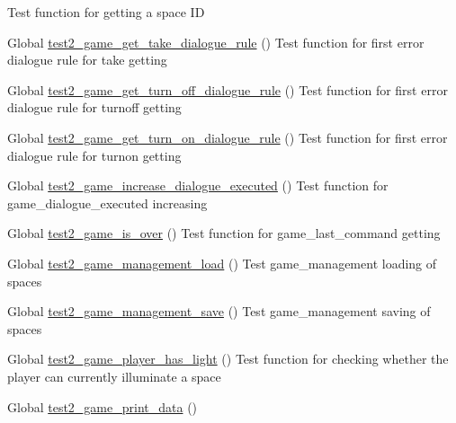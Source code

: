\begin{DoxyRefList}
%
Test function for getting a space ID  
\item[Global \mbox{\hyperlink{game__test_8c_a8b15ec8c8df88fdabcf8193fd6e143d4}{test2\+\_\+game\+\_\+get\+\_\+take\+\_\+dialogue\+\_\+rule}} ()]\label{test__test000336}%
%
Test function for first error dialogue rule for take getting  
\item[Global \mbox{\hyperlink{game__test_8c_af221f7b830274f0908050c98f1091024}{test2\+\_\+game\+\_\+get\+\_\+turn\+\_\+off\+\_\+dialogue\+\_\+rule}} ()]\label{test__test000362}%
%
Test function for first error dialogue rule for turnoff getting  
\item[Global \mbox{\hyperlink{game__test_8c_a6841a7c6d681976c7ecb6490cfedae02}{test2\+\_\+game\+\_\+get\+\_\+turn\+\_\+on\+\_\+dialogue\+\_\+rule}} ()]\label{test__test000356}%
%
Test function for first error dialogue rule for turnon getting  
\item[Global \mbox{\hyperlink{game__test_8c_a98e036c218642ab5490d742365a865f6}{test2\+\_\+game\+\_\+increase\+\_\+dialogue\+\_\+executed}} ()]\label{test__test000304}%
%
Test function for game\+\_\+dialogue\+\_\+executed increasing  
\item[Global \mbox{\hyperlink{game__test_8c_aad6c50be5f1d541ca5414b86558ef422}{test2\+\_\+game\+\_\+is\+\_\+over}} ()]\label{test__test000147}%
%
Test function for game\+\_\+last\+\_\+command getting  
\item[Global \mbox{\hyperlink{game__management__test_8c_a507fc7bcd3073298c0e78ff651b864f3}{test2\+\_\+game\+\_\+management\+\_\+load}} ()]\label{test__test000110}%
%
Test game\+\_\+management loading of spaces  
\item[Global \mbox{\hyperlink{game__management__test_8c_a29bd8e54b3cff03a5130d6c81901573e}{test2\+\_\+game\+\_\+management\+\_\+save}} ()]\label{test__test000124}%
%
Test game\+\_\+management saving of spaces  
\item[Global \mbox{\hyperlink{game__test_8c_af9582d7aa0ef6f40acf144163c713a01}{test2\+\_\+game\+\_\+player\+\_\+has\+\_\+light}} ()]\label{test__test000171}%
%
Test function for checking whether the player can currently illuminate a space  
\item[Global \mbox{\hyperlink{game__test_8c_a4aab0e535a3ff18bec915924bf830492}{test2\+\_\+game\+\_\+print\+\_\+data}} ()]\label{test__test000149}%

\end{DoxyRefList}
